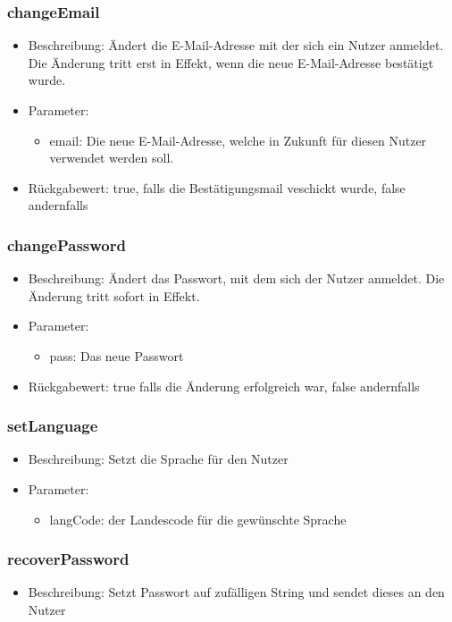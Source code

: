 \documentclass[a4paper]{scrreprt}
\begin{document}
		\subsubsection{changeEmail}
			\begin{itemize}
				\item Beschreibung: Ändert die E-Mail-Adresse mit der sich ein Nutzer anmeldet. Die Änderung tritt erst in Effekt, wenn die neue E-Mail-Adresse bestätigt wurde.
				\item Parameter:
				\begin{itemize}
					\item email: Die neue E-Mail-Adresse, welche in Zukunft für diesen Nutzer verwendet werden soll.
				\end{itemize}
				\item Rückgabewert: true, falls die Bestätigungsmail veschickt wurde, false andernfalls
			\end{itemize}
			\subsubsection{changePassword}
			\begin{itemize}
				\item Beschreibung: Ändert das Passwort, mit dem sich der Nutzer anmeldet. Die Änderung tritt sofort in Effekt.
				\item Parameter:
				\begin{itemize}
					\item pass: Das neue Passwort
				\end{itemize}
				\item Rückgabewert: true falls die Änderung erfolgreich war, false andernfalls
			\end{itemize}
		\subsubsection{setLanguage}
			\begin{itemize}
				\item Beschreibung: Setzt die Sprache für den Nutzer
				\item Parameter:
				\begin{itemize}
					\item langCode: der Landescode für die gewünschte Sprache
				\end{itemize}
			\end{itemize}
		\subsubsection{recoverPassword}
		\begin{itemize}
		\item Beschreibung: Setzt Passwort auf zufälligen String und sendet dieses an den Nutzer
		\end{itemize}
\end{document}
